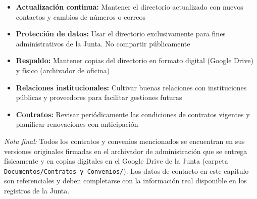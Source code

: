 \begin{itemize}
  \item \textbf{Actualización continua:} Mantener el directorio actualizado con nuevos contactos y cambios de números o correos
  \item \textbf{Protección de datos:} Usar el directorio exclusivamente para fines administrativos de la Junta. No compartir públicamente
  \item \textbf{Respaldo:} Mantener copias del directorio en formato digital (Google Drive) y físico (archivador de oficina)
  \item \textbf{Relaciones institucionales:} Cultivar buenas relaciones con instituciones públicas y proveedores para facilitar gestiones futuras
  \item \textbf{Contratos:} Revisar periódicamente las condiciones de contratos vigentes y planificar renovaciones con anticipación
\end{itemize}

\textit{Nota final:} Todos los contratos y convenios mencionados se encuentran en sus versiones originales firmadas en el archivador de administración que se entrega físicamente y en copias digitales en el Google Drive de la Junta (carpeta \texttt{Documentos/Contratos\_y\_Convenios/}). Los datos de contacto en este capítulo son referenciales y deben completarse con la información real disponible en los registros de la Junta.
